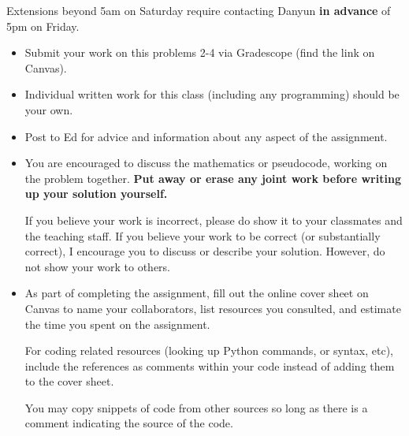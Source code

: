 \documentclass[12pt,letterpaper,noanswers]{exam}
\begin{document}
 \pdfpageheight 11in 
  \pdfpagewidth 8.5in

\noindent Extensions beyond 5am on Saturday require contacting Danyun \textbf{in advance} of 5pm on Friday.

\begin{itemize}
\item Submit your work on this problems 2-4 via Gradescope (find the link on Canvas).
\item Individual written work for this class (including any programming) should be your own.  
\item Post to Ed for advice and information about any aspect of the assignment.
\item You are encouraged to discuss the mathematics or pseudocode, working on the problem together.  \textbf{Put away or erase any joint work before writing up your solution yourself.}

If you believe your work is incorrect, please do show it to your classmates and the teaching staff.  If you believe your work to be correct (or substantially correct), I encourage you to discuss or describe your solution.  However, do not show your work to others.

\item As part of completing the assignment, fill out the online cover sheet on Canvas to name your collaborators, list resources you consulted, and estimate the time you spent on the assignment.

For coding related resources (looking up Python commands, or syntax, etc), include the references as comments within your code instead of adding them to the cover sheet.

You may copy snippets of code from other sources so long as there is a comment indicating the source of the code.
\end{itemize}
\end{document}
